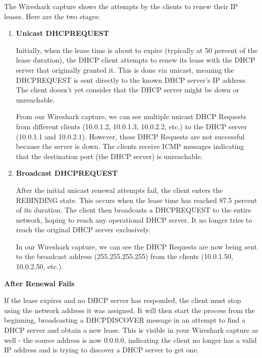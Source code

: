 The Wireshark capture shows the attempts by the clients to renew their IP leases. Here are the two stages:

\begin{enumerate}[label=\textbf{Stage \arabic*:}]
\item \textbf{Unicast DHCPREQUEST}

Initially, when the lease time is about to expire (typically at 50 percent of the lease duration), the DHCP client attempts to renew its lease with the DHCP server that originally granted it. This is done via unicast, meaning the DHCPREQUEST is sent directly to the known DHCP server's IP address. The client doesn't yet consider that the DHCP server might be down or unreachable.

From our Wireshark capture, we can see multiple unicast DHCP Requests from different clients (10.0.1.2, 10.0.1.3, 10.0.2.2, etc.) to the DHCP server (10.0.1.1 and 10.0.2.1). However, these DHCP Requests are not successful because the server is down. The clients receive ICMP messages indicating that the destination port (the DHCP server) is unreachable.

\item \textbf{Broadcast DHCPREQUEST}

After the initial unicast renewal attempts fail, the client enters the REBINDING state. This occurs when the lease time has reached 87.5 percent of its duration. The client then broadcasts a DHCPREQUEST to the entire network, hoping to reach any operational DHCP server. It no longer tries to reach the original DHCP server exclusively.

In our Wireshark capture, we can see the DHCP Requests are now being sent to the broadcast address (255.255.255.255) from the clients (10.0.1.50, 10.0.2.50, etc.).

\end{enumerate}

\textbf{After Renewal Fails}

If the lease expires and no DHCP server has responded, the client must stop using the network address it was assigned. It will then start the process from the beginning, broadcasting a DHCPDISCOVER message in an attempt to find a DHCP server and obtain a new lease. This is visible in your Wireshark capture as well - the source address is now 0.0.0.0, indicating the client no longer has a valid IP address and is trying to discover a DHCP server to get one.
